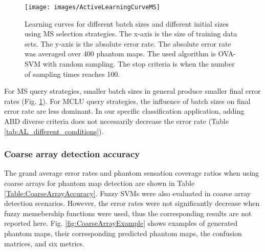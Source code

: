 \begin{figure}[htbp]
    \centering
        \texttt{[image: images/ActiveLearningCurveMS]}
    \caption{Learning curves for different batch sizes and different initial sizes using MS selection strategies. The x-axis is the size of training data sets. The y-axis is the absolute error rate. The absolute error rate was averaged over 400 phantom maps. The used algorithm is OVA-SVM with random sampling. The stop criteria is when the number of sampling times reaches 100. }
    \label{fig:active_learning_curves}
\end{figure} 

For MS query strategies, smaller batch sizes in general produce smaller final error rates (Fig. \ref{fig:active_learning_curves}). For MCLU query strategies, the influence of batch sizes on final error rate are less dominant. In our specific classification application, adding ABD diverse criteria does not necessarily decrease the error rate (Table \ref{tab:AL_different_conditions}).

\subsubsection{Coarse array detection accuracy}
The grand average error rates and phantom sensation coverage ratios when using coarse arrays for phantom map detection are shown in Table \ref{Table:CoarseArrayAccuracy}.
Fuzzy SVMs were also evaluated in coarse array detection scenarios. However, the error rates were not significantly decrease when fuzzy memebership functions were used, thus the corresponding results are not reported here.
Fig. \ref{fig:CoarseArrayExample} shows examples of generated phantom maps, their corresponding predicted phantom maps, the confusion matrices, and six metrics.
           
